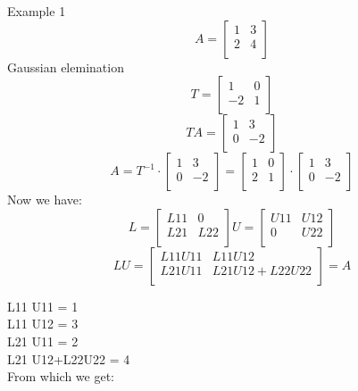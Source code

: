 \documentclass{article}
\begin{document}
Example 1\\
$$ A= 
\begin{bmatrix}
1 & 3\\
2 & 4 \\
\end{bmatrix}
$$ 
Gaussian elemination\\
$$ T= 
\begin{bmatrix}
1 & 0\\
-2 & 1 \\
\end{bmatrix}
$$
$$
TA=
\begin{bmatrix}
1 & 3\\
0 & -2 \\
\end{bmatrix}
$$
$$A = T^{-1} \cdot
\begin{bmatrix}
1 & 3\\
0 & -2 \\
\end{bmatrix}= \begin{bmatrix}
1 & 0\\
2 & 1 \\
\end{bmatrix}
\cdot \begin{bmatrix}
1 & 3\\
 0& -2 \\
\end{bmatrix}
$$
Now we have:
$$L = 
\begin{bmatrix}
L11 & 0\\
L21 & L22 \\
\end{bmatrix}
U = 
\begin{bmatrix}
U11 & U12\\
 0 & U22 \\
\end{bmatrix}
$$
$$
L U= 
\begin{bmatrix}
L11 U11 & L11 U12\\
L21 U11 & L21 U12+L22U22 \\
\end{bmatrix}
= A
$$


L11 U11 = 1\\

L11 U12 = 3\\

L21 U11 = 2\\

L21 U12+L22U22  = 4\\

From which we get:\\
\end{document}

